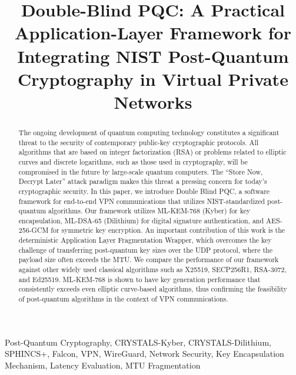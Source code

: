 \documentclass[10pt, conference, letterpaper]{IEEEtran}
\begin{document}
\title{Double-Blind PQC: A Practical Application-Layer Framework for Integrating NIST Post-Quantum Cryptography in Virtual Private Networks\\
}

\author{
}

\maketitle

\begin{abstract}
The ongoing development of quantum computing technology constitutes a significant threat to the security of contemporary public-key cryptographic protocols. All algorithms that are based on integer factorization (RSA) or problems related to elliptic curves and discrete logarithms, such as those used in cryptography, will be compromised in the future by large-scale quantum computers. The ``Store Now, Decrypt Later'' attack paradigm makes this threat a pressing concern for today's cryptographic security. In this paper, we introduce Double Blind PQC, a software framework for end-to-end VPN communications that utilizes NIST-standardized post-quantum algorithms. Our framework utilizes ML-KEM-768 (Kyber) for key encapsulation, ML-DSA-65 (Dilithium) for digital signature authentication, and AES-256-GCM for symmetric key encryption. An important contribution of this work is the deterministic Application Layer Fragmentation Wrapper, which overcomes the key challenge of transferring post-quantum key sizes over the UDP protocol, where the payload size often exceeds the MTU. We compare the performance of our framework against other widely used classical algorithms such as X25519, SECP256R1, RSA-3072, and Ed25519. ML-KEM-768 is shown to have key generation performance that consistently exceeds even elliptic curve-based algorithms, thus confirming the feasibility of post-quantum algorithms in the context of VPN communications.
\end{abstract}

\begin{IEEEkeywords}
Post-Quantum Cryptography, CRYSTALS-Kyber, CRYSTALS-Dilithium, SPHINCS+, Falcon, VPN, WireGuard, Network Security, Key Encapsulation Mechanism, Latency Evaluation, MTU Fragmentation
\end{IEEEkeywords}
\end{document}
